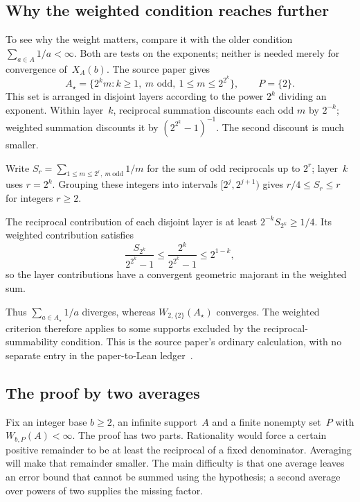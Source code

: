 \documentclass[10pt]{article}
\begin{document}
\subsection{Why the weighted condition reaches further}

To see why the weight matters, compare it with the older condition $\sum_{a\in A}1/a<\infty$. Both are tests on the exponents; neither is needed merely for convergence of~$X_A(b)$. The source paper gives
\[
 A_\star=\{2^km:k\ge1,\ m\text{ odd},\ 1\le m\le2^{2^k}\},\qquad P=\{2\}.
\]
This set is arranged in disjoint layers according to the power $2^k$ dividing an exponent. Within layer~$k$, reciprocal summation discounts each odd $m$ by $2^{-k}$; weighted summation discounts it by $(2^{2^k}-1)^{-1}$. The second discount is much smaller.

Write $S_r=\sum_{1\le m\le2^r,\ m\ \mathrm{odd}}1/m$ for the sum of odd reciprocals up to $2^r$; layer~$k$ uses $r=2^k$. Grouping these integers into intervals $[2^j,2^{j+1})$ gives $r/4\le S_r\le r$ for integers $r\ge2$.

The reciprocal contribution of each disjoint layer is at least $2^{-k}S_{2^k}\ge1/4$. Its weighted contribution satisfies
\[
 \frac{S_{2^k}}{2^{2^k}-1}\le\frac{2^k}{2^{2^k}-1}\le2^{1-k},
\]
so the layer contributions have a convergent geometric majorant in the weighted sum.

Thus $\sum_{a\in A_\star}1/a$ diverges, whereas $W_{2,\{2\}}(A_\star)$ converges. The weighted criterion therefore applies to some supports excluded by the reciprocal-summability condition. This is the source paper's ordinary calculation, with no separate entry in the paper-to-Lean ledger~\cite[calculation following the weighted proof]{paper257}.

\subsection{The proof by two averages}

Fix an integer base $b\ge2$, an infinite support~$A$ and a finite nonempty set~$P$ with $W_{b,P}(A)<\infty$. The proof has two parts. Rationality would force a certain positive remainder to be at least the reciprocal of a fixed denominator. Averaging will make that remainder smaller. The main difficulty is that one average leaves an error bound that cannot be summed using the hypothesis; a second average over powers of two supplies the missing factor.
\end{document}
